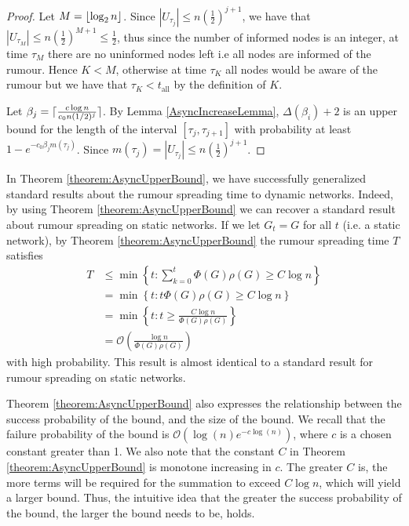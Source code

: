 \begin{proof}
	Let $M = \lfloor\log_2 n\rfloor$. Since $|U_{\tau_j}| \leq n(\frac{1}{2})^{j+1}$, we have that $|U_{\tau_M}| \leq n(\frac{1}{2})^{M+1} \leq \frac{1}{2}$, thus since the number of informed nodes is an integer, at time $\tau_M$ there are no uninformed nodes left i.e all nodes are informed of the rumour. Hence $K < M$, otherwise at time $\tau_K$ all nodes would be aware of the rumour but we have that $\tau_K < t_\text{all}$ by the definition of $K$.

	Let $\beta_j = \lceil\frac{c \log n}{c_0 n(1/2)^j}\rceil$. %
	By Lemma \ref{AsyncIncreaseLemma}, $\Delta(\beta_i) + 2$ is an upper bound for the length of the interval $[\tau_j, \tau_{j+1}]$ 
	with probability at least $1 - e^{-c_0\beta_j m(\tau_j)}$. %
	Since $m(\tau_j) = |U_{\tau_j}| \leq n(\frac{1}{2})^{j+1}$. %

\end{proof}

In Theorem \ref{theorem:AsyncUpperBound}, we have successfully generalized standard results about the rumour spreading time to dynamic networks. Indeed, by using Theorem \ref{theorem:AsyncUpperBound} we can recover a standard result about rumour spreading on static networks. If we let $G_t = G$ for all $t$ (i.e. a static network), by Theorem \ref{theorem:AsyncUpperBound} the rumour spreading time $T$ satisfies 
\begin{align*}
	T &\leq \min \left\{t : \sum_{k=0}^t \Phi(G)\rho(G) \geq C \log n \right\} \\
	&= \min \left\{t : t \Phi(G)\rho(G) \geq C \log n \right\}  \\
	&= \min \left\{t : t \geq \frac{C \log n}{\Phi(G)\rho(G)}\right\}  \\
	&= \mathcal{O}\left(\frac{\log n}{\Phi(G)\rho(G)}\right)
\end{align*}
with high probability. This result is almost identical to a standard result for rumour spreading on static networks.  %


Theorem \ref{theorem:AsyncUpperBound} also expresses the relationship between the success probability of the bound, and the size of the bound. We recall that the failure probability of the bound is $\mathcal{O}\left(\log(n) e^{-c \log(n)}\right)$, where $c$ is a chosen constant greater than 1. %
We also note that the constant $C$ in Theorem \ref{theorem:AsyncUpperBound} is monotone increasing in $c$. The greater $C$ is, the more terms will be required for the summation to exceed $C \log n$, which will yield a larger bound. 
Thus, the intuitive idea that the greater the success probability of the bound, the larger the bound needs to be, holds. %

